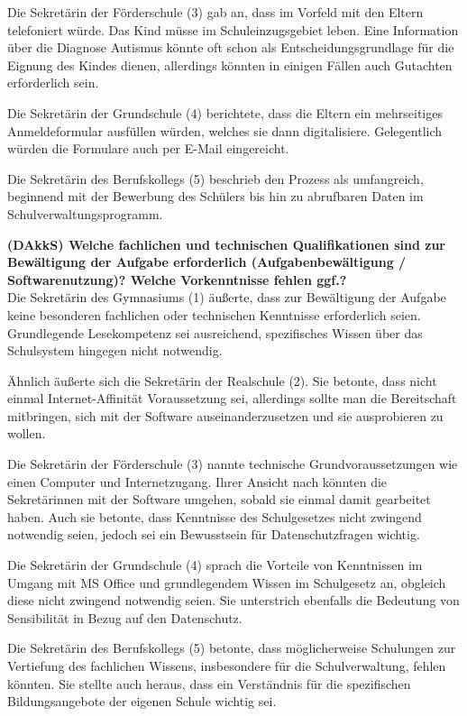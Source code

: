 Die Sekretärin der Förderschule (3) gab an, dass im Vorfeld mit den Eltern telefoniert würde. Das Kind müsse im Schuleinzugsgebiet leben. Eine Information über die Diagnose Autismus könnte oft schon als Entscheidungsgrundlage für die Eignung des Kindes dienen, allerdings könnten in einigen Fällen auch Gutachten erforderlich sein.

Die Sekretärin der Grundschule (4) berichtete, dass die Eltern ein mehrseitiges Anmeldeformular ausfüllen würden, welches sie dann digitalisiere. Gelegentlich würden die Formulare auch per E-Mail eingereicht.

Die Sekretärin des Berufskollegs (5) beschrieb den Prozess als umfangreich, beginnend mit der Bewerbung des Schülers bis hin zu abrufbaren Daten im Schulverwaltungsprogramm.

\textbf{(DAkkS) Welche fachlichen und technischen Qualifikationen sind zur Bewältigung der Aufgabe erforderlich (Aufgabenbewältigung / Softwarenutzung)? Welche Vorkenntnisse fehlen ggf.?}\\
Die Sekretärin des Gymnasiums (1) äußerte, dass zur Bewältigung der Aufgabe keine besonderen fachlichen oder technischen Kenntnisse erforderlich seien. Grundlegende Lesekompetenz sei ausreichend, spezifisches Wissen über das Schulsystem hingegen nicht notwendig.

Ähnlich äußerte sich die Sekretärin der Realschule (2). Sie betonte, dass nicht einmal Internet-Affinität Voraussetzung sei, allerdings sollte man die Bereitschaft mitbringen, sich mit der Software auseinanderzusetzen und sie ausprobieren zu wollen.

Die Sekretärin der Förderschule (3) nannte technische Grundvoraussetzungen wie einen Computer und Internetzugang. Ihrer Ansicht nach könnten die Sekretärinnen mit der Software umgehen, sobald sie einmal damit gearbeitet haben. Auch sie betonte, dass Kenntnisse des Schulgesetzes nicht zwingend notwendig seien, jedoch sei ein Bewusstsein für Datenschutzfragen wichtig.

Die Sekretärin der Grundschule (4) sprach die Vorteile von Kenntnissen im Umgang mit MS Office und grundlegendem Wissen im Schulgesetz an, obgleich diese nicht zwingend notwendig seien. Sie unterstrich ebenfalls die Bedeutung von Sensibilität in Bezug auf den Datenschutz.

Die Sekretärin des Berufskollegs (5) betonte, dass möglicherweise Schulungen zur Vertiefung des fachlichen Wissens, insbesondere für die Schulverwaltung, fehlen könnten. Sie stellte auch heraus, dass ein Verständnis für die spezifischen Bildungsangebote der eigenen Schule wichtig sei.


